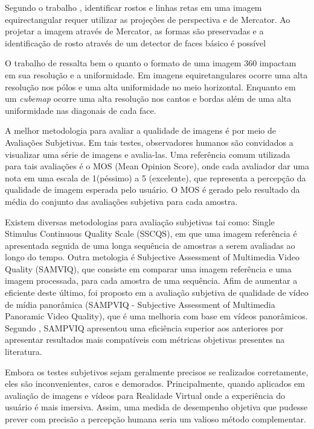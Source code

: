 \documentclass[conference]{IEEEtran}
\begin{document}

Segundo o trabalho \cite{sacht2010face}, identificar rostos e linhas retas em uma imagem equirectangular requer utilizar as projeções de perspectiva e de Mercator. Ao projetar a imagem através de Mercator, as formas são preservadas e a identificação de rosto através de um detector de faces básico é possível


O trabalho de \cite{dunn2017resolution} ressalta bem o quanto o formato de uma imagem 360 impactam em sua resolução e a uniformidade. Em imagens equiretangulares ocorre uma alta resolução nos pólos e uma alta uniformidade no meio horizontal. Enquanto em um \textit{cubemap} ocorre uma alta resolução nos cantos e bordas além de uma alta uniformidade nas diagonais de cada face.

A melhor metodologia para avaliar a qualidade de imagens é por meio de Avaliações Subjetivas. Em tais testes, observadores humanos são convidados a visualizar uma série de imagens e avalia-las. Uma referência comum utilizada para tais avaliações é o MOS (Mean Opinion Score), onde cada avaliador dar uma nota em uma escala de 1(péssimo) a 5 (excelente), que representa a percepção da qualidade de imagem esperada pelo usuário. O MOS é gerado pelo resultado da média do conjunto das avaliações subjetiva para cada amostra.

 Existem diversas metodologias para avaliação subjetivas tai como: Single Stimulus Continuous Quality Scale (SSCQS), em que uma imagem referência é apresentada seguida de uma longa sequência de amostras a serem avaliadas ao longo do tempo. Outra metologia é Subjective Assessment of Multimedia Video Quality (SAMVIQ), que consiste em comparar uma imagem referência e uma imagem processada, para cada amostra de uma sequência. Afim de aumentar a eficiente deste último, foi proposto em \cite{zhang2017subjective} a avaliação subjetiva de qualidade de vídeo de mídia panorâmica (SAMPVIQ - Subjective Assessment of Multimedia Panoramic Video Quality), que é uma melhoria com base em vídeos panorâmicos. Segundo \cite{zhang2017subjective}, SAMPVIQ apresentou uma eficiência superior aos anteriores por apresentar resultados mais compatíveis com métricas objetivas presentes na literatura.

Embora os testes subjetivos sejam geralmente precisos se realizados corretamente, eles são inconvenientes, caros e demorados. Principalmente, quando aplicados em avaliação de imagens e vídeos para Realidade Virtual onde a experiência do usuário é mais imersiva. Assim, uma medida de desempenho objetiva que pudesse prever com precisão a percepção humana seria um valioso método complementar.
\end{document}
